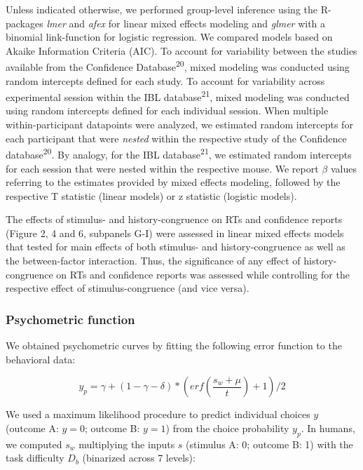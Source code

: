 \documentclass[
]{article}
\begin{document}
Unless indicated otherwise, we performed group-level inference using the
R-packages \emph{lmer} and \emph{afex} for linear mixed effects modeling
and \emph{glmer} with a binomial link-function for logistic regression.
We compared models based on Akaike Information Criteria (AIC). To
account for variability between the studies available from the
Confidence Database\textsuperscript{20}, mixed modeling was conducted
using random intercepts defined for each study. To account for
variability across experimental session within the IBL
database\textsuperscript{21}, mixed modeling was conducted using random
intercepts defined for each individual session. When multiple
within-participant datapoints were analyzed, we estimated random
intercepts for each participant that were \emph{nested} within the
respective study of the Confidence database\textsuperscript{20}. By
analogy, for the IBL database\textsuperscript{21}, we estimated random
intercepts for each session that were nested within the respective
mouse. We report \(\beta\) values referring to the estimates provided by
mixed effects modeling, followed by the respective T statistic (linear
models) or z statistic (logistic models).

The effects of stimulus- and history-congruence on RTs and confidence
reports (Figure 2, 4 and 6, subpanels G-I) were assessed in linear mixed
effects models that tested for main effects of both stimulus- and
history-congruence as well as the between-factor interaction. Thus, the
significance of any effect of history-congruence on RTs and confidence
reports was assessed while controlling for the respective effect of
stimulus-congruence (and vice versa).

\hypertarget{psychometric-function}{%
\subsubsection{Psychometric function}\label{psychometric-function}}

We obtained psychometric curves by fitting the following error function
to the behavioral data:

\begin{equation}
y_p = \gamma + (1 - \gamma - \delta) *  (erf(\frac{s_w + \mu}{t}) + 1) / 2
\end{equation}

We used a maximum likelihood procedure to predict individual choices
\(y\) (outcome A: \(y = 0\); outcome B: \(y = 1\)) from the choice
probability \(y_p\). In humans, we computed \(s_w\) multiplying the
inputs \(s\) (stimulus A: 0; outcome B: 1) with the task difficulty
\(D_b\) (binarized across 7 levels):
\end{document}
